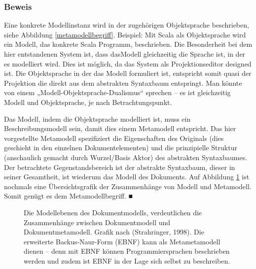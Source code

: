 \subsubsection{Beweis}\label{}

 
Eine konkrete Modellinstanz wird in der zugehörigen Objektsprache beschrieben, siehe Abbildung \ref{metamodellbegriff}. Beispiel: Mit Scala als Objektsprache wird ein Modell, das konkrete Scala Programm, beschrieben. Die Besonderheit bei dem hier entstandenen System ist, dass dasModell gleichzeitig die Sprache ist, in der es modelliert wird. Dies ist möglich, da das System als Projektionseditor designed ist. Die Objektsprache in der das Modell formuliert ist, entspricht somit quasi der Projektion die direkt aus dem abstrakten Syntaxbaum entspringt. Man könnte von einem „Modell-Objektsprache-Dualismus“ sprechen -- es ist gleichzeitig Modell und Objektsprache, je nach Betrachtungspunkt.

 
Das Modell, indem die Objektsprache modelliert ist, muss ein Beschreibungsmodell sein, damit dies einem Metamodell entspricht. Das hier vorgestellte Metamodell spezifiziert die Eigenschaften des Originals (dies geschieht in den einzelnen Dokumentelementen) und die prinzipielle Struktur (anschaulich gemacht durch Wurzel/Basis Aktor) des abstrakten Syntaxbaumes. Der betrachtete Gegenstandsbereich ist der abstrakte Syntaxbaum, dieser in seiner Gesamtheit, ist wiederum das Modell des Dokuments. Auf Abbildung \ref{metamodellschema} ist nochmals eine Übersichtsgrafik der Zusammenhänge von Modell und Metamodell. Somit genügt es dem Metamodellbegriff. ■

 
\begin{figure}[h!]
\centering
\advance\leftskip-2.5cm
\caption[Modellebenen des Dokumentmodells]{ Die Modellebenen des Dokumentmodells, verdeutlichen die Zusammenhänge zwischen Dokumentmodell und Dokumentmetamodell. Grafik nach (Strahringer, 1998). Die erweiterte Backus-Naur-Form (EBNF) kann als Metametamodell dienen -- denn mit EBNF können Programmiersprachen beschrieben werden und zudem ist EBNF in der Lage sich selbst zu beschreiben. }\label{metamodellschema}
\end{figure}
 
